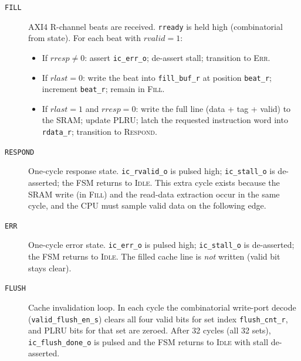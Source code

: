\begin{description}
  \item[\texttt{FILL}]
    AXI4 R-channel beats are received.
    \texttt{rready} is held high (combinatorial from state).
    For each beat with $\mathit{rvalid}{=}1$:
    \begin{itemize}
      \item If $\mathit{rresp}{\neq}0$: assert \texttt{ic\_err\_o};
        de-assert stall; transition to \textsc{Err}.
      \item If $\mathit{rlast}{=}0$: write the beat into
        \texttt{fill\_buf\_r} at position \texttt{beat\_r}; increment
        \texttt{beat\_r}; remain in \textsc{Fill}.
      \item If $\mathit{rlast}{=}1$ and $\mathit{rresp}{=}0$:
        write the full line (data + tag + valid) to the SRAM;
        update PLRU; latch the requested instruction word into
        \texttt{rdata\_r}; transition to \textsc{Respond}.
    \end{itemize}

  \item[\texttt{RESPOND}]
    One-cycle response state.
    \texttt{ic\_rvalid\_o} is pulsed high; \texttt{ic\_stall\_o} is
    de-asserted; the FSM returns to \textsc{Idle}.
    This extra cycle exists because the SRAM write (in \textsc{Fill})
    and the read-data extraction occur in the same cycle, and the
    CPU must sample valid data on the following edge.

  \item[\texttt{ERR}]
    One-cycle error state.
    \texttt{ic\_err\_o} is pulsed high; \texttt{ic\_stall\_o} is
    de-asserted; the FSM returns to \textsc{Idle}.
    The filled cache line is \emph{not} written (valid bit stays clear).

  \item[\texttt{FLUSH}]
    Cache invalidation loop.
    In each cycle the combinatorial write-port decode
    (\texttt{valid\_flush\_en\_s}) clears all four valid bits for set
    index \texttt{flush\_cnt\_r}, and PLRU bits for that set are zeroed.
    After 32 cycles (all 32 sets), \texttt{ic\_flush\_done\_o} is
    pulsed and the FSM returns to \textsc{Idle} with stall de-asserted.

\end{description}
